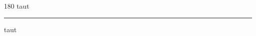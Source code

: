 
\begin{frame}
\begin{center}
\begin{turn}{180}
{\fontsize{2.5cm}{1em}\selectfont taut}
\end{turn}
\vspace{1em}\par  
\hrule
\vspace{1em}\par  
{\fontsize{2.5cm}{1em}\selectfont taut}
\end{center}
\end{frame}
